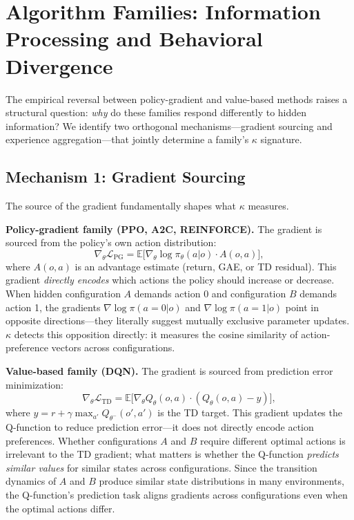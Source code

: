 \documentclass[letterpaper]{article}
\begin{document}
\section{Algorithm Families: Information Processing and Behavioral Divergence}

The empirical reversal between policy-gradient and value-based methods raises a structural question: \textit{why} do these families respond differently to hidden information?
We identify two orthogonal mechanisms---gradient sourcing and experience aggregation---that jointly determine a family's $\kappa$ signature.

\subsection{Mechanism 1: Gradient Sourcing}

The source of the gradient fundamentally shapes what $\kappa$ measures.

\medskip
\noindent\textbf{Policy-gradient family (PPO, A2C, REINFORCE).}
The gradient is sourced from the policy's own action distribution:
\[
\nabla_\theta \mathcal{L}_{\text{PG}} = \mathbb{E}\bigl[ \nabla_\theta \log \pi_\theta(a|o) \cdot A(o,a) \bigr],
\]
where $A(o,a)$ is an advantage estimate (return, GAE, or TD residual).
This gradient \textit{directly encodes} which actions the policy should increase or decrease.
When hidden configuration $A$ demands action 0 and configuration $B$ demands action 1, the gradients $\nabla \log \pi(a{=}0|o)$ and $\nabla \log \pi(a{=}1|o)$ point in opposite directions---they literally suggest mutually exclusive parameter updates.
$\kappa$ detects this opposition directly: it measures the cosine similarity of action-preference vectors across configurations.

\medskip
\noindent\textbf{Value-based family (DQN).}
The gradient is sourced from prediction error minimization:
\[
\nabla_\theta \mathcal{L}_{\text{TD}} = \mathbb{E}\bigl[ \nabla_\theta Q_\theta(o,a) \cdot (Q_\theta(o,a) - y) \bigr],
\]
where $y = r + \gamma \max_{a'} Q_{\theta^-}(o',a')$ is the TD target.
This gradient updates the Q-function to reduce prediction error---it does not directly encode action preferences.
Whether configurations $A$ and $B$ require different optimal actions is irrelevant to the TD gradient; what matters is whether the Q-function \textit{predicts similar values} for similar states across configurations.
Since the transition dynamics of $A$ and $B$ produce similar state distributions in many environments, the Q-function's prediction task aligns gradients across configurations even when the optimal actions differ.
\end{document}
